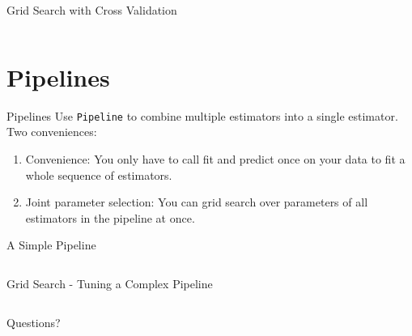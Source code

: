 \documentclass{lug}
\begin{document}
\begin{frame}{Grid Search with Cross Validation}
\inputminted[fontsize=\scriptsize]{python3}{examples/gridsearch.py}
\end{frame}

\section{Pipelines}
\begin{frame}{Pipelines}
  Use \texttt{Pipeline} to combine multiple estimators into a single estimator. Two conveniences:
  \begin{enumerate}
    \item Convenience: You only have to call fit and predict once on your data to fit a whole sequence of estimators.
    \item Joint parameter selection: You can grid search over parameters of all estimators in the pipeline at once.
  \end{enumerate}
\end{frame}

\begin{frame}{A Simple Pipeline}
  \inputminted[fontsize=\scriptsize]{python3}{examples/pipeline.py}
\end{frame}

\begin{frame}{Grid Search - Tuning a Complex Pipeline}
  \inputminted[fontsize=\scriptsize]{python3}{examples/gridsearch_pipeline.py}
\end{frame}

\begin{frame}[standout]
    \Huge
    Questions?
\end{frame}
\end{document}
